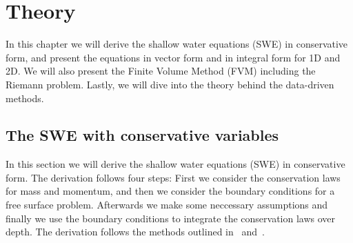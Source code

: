 \chapter{Theory}
In this chapter we will derive the shallow water equations (SWE) in conservative form, and present the equations in vector form and in integral form for 1D and 2D.
We will also present the Finite Volume Method (FVM) including the Riemann problem.
Lastly, we will dive into the theory behind the data-driven methods.



\section{The SWE with conservative variables}
In this section we will derive the shallow water equations (SWE) in conservative form.
The derivation follows four steps: First we consider the conservation laws for mass and momentum, and then we consider the boundary conditions for a free surface problem.
Afterwards we make some neccessary assumptions and finally we use the boundary conditions to integrate the conservation laws over depth.
The derivation follows the methods outlined in~\cite{Toro2001-Shock} and~\cite{Vreugdenhil1994}.

